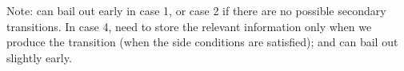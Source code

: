 






Note: can bail out early in case 1, or case 2 if there are no possible
secondary transitions.  In case 4, need to store the relevant information only
when we produce the transition (when the side conditions are satisfied); and
can  bail out slightly early.

